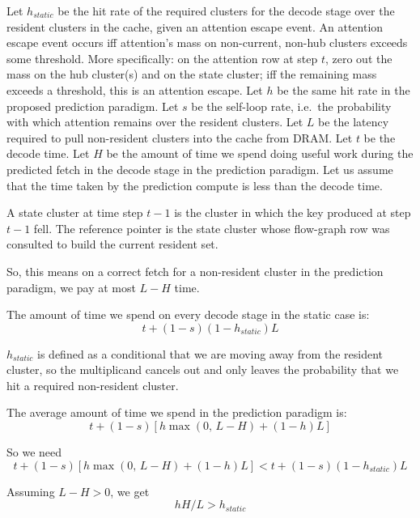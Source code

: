 \documentclass[11pt,a4paper]{article}
\begin{document}
Let $h_{static}$ be the hit rate of the required clusters for the decode stage over the resident clusters in the cache, given an attention escape event. An attention escape event occurs iff attention's mass on non-current, non-hub clusters exceeds some threshold. More specifically: on the attention row at step $t$, zero out the mass on the hub cluster(s) and on the state cluster; iff the remaining mass exceeds a threshold, this is an attention escape. Let $h$ be the same hit rate in the proposed prediction paradigm. Let $s$ be the self-loop rate, i.e.\ the probability with which attention remains over the resident clusters. Let $L$ be the latency required to pull non-resident clusters into the cache from DRAM. Let $t$ be the decode time. Let $H$ be the amount of time we spend doing useful work during the predicted fetch in the decode stage in the prediction paradigm. Let us assume that the time taken by the prediction compute is less than the decode time.

A state cluster at time step $t-1$ is the cluster in which the key produced at step $t-1$ fell. The reference pointer is the state cluster whose flow-graph row was consulted to build the current resident set.

So, this means on a correct fetch for a non-resident cluster in the prediction paradigm, we pay at most $L-H$ time.

The amount of time we spend on every decode stage in the static case is:
\begin{equation*}
    t + (1-s)(1-h_{static})L
\end{equation*}

$h_{static}$ is defined as a conditional that we are moving away from the resident cluster, so the multiplicand cancels out and only leaves the probability that we hit a required non-resident cluster.

The average amount of time we spend in the prediction paradigm is:
\begin{equation*}
    t + (1-s)\left[h\max(0,\, L-H) + (1-h)L\right]
\end{equation*}

So we need
\begin{equation*}
    t + (1-s)\left[h\max(0,\, L-H) + (1-h)L\right] < t + (1-s)(1-h_{static})L
\end{equation*}

Assuming $L-H > 0$, we get
\begin{equation*}
    hH/L > h_{static}
\end{equation*}
\end{document}
